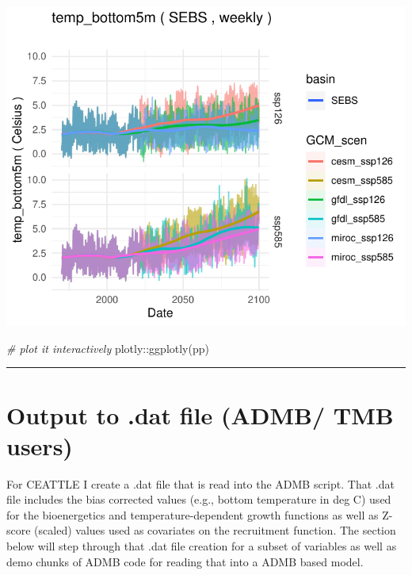 \documentclass[
]{article}
\newenvironment{Shaded}{\begin{snugshade}}{\end{snugshade}}
\newcommand{\CommentTok}[1]{\textcolor[rgb]{0.56,0.35,0.01}{\textit{#1}}}
\newcommand{\FunctionTok}[1]{\textcolor[rgb]{0.00,0.00,0.00}{#1}}
\newcommand{\NormalTok}[1]{#1}
\newcommand{\SpecialCharTok}[1]{\textcolor[rgb]{0.00,0.00,0.00}{#1}}
\begin{document}
\begin{center}\includegraphics{ACLIM2_quickStart_files/figure-latex/sizespec-2} \end{center}

\begin{Shaded}
\begin{Highlighting}[]
\CommentTok{\# plot it interactively}
\NormalTok{plotly}\SpecialCharTok{::}\FunctionTok{ggplotly}\NormalTok{(pp)}
\end{Highlighting}
\end{Shaded}

\begin{center}\rule{0.5\linewidth}{0.5pt}\end{center}

\hypertarget{output-to-.dat-file-admb-tmb-users}{%
\section{Output to .dat file (ADMB/ TMB
users)}\label{output-to-.dat-file-admb-tmb-users}}

For CEATTLE I create a .dat file that is read into the ADMB script. That
.dat file includes the bias corrected values (e.g., bottom temperature
in deg C) used for the bioenergetics and temperature-dependent growth
functions as well as Z-score (scaled) values used as covariates on the
recruitment function. The section below will step through that .dat file
creation for a subset of variables as well as demo chunks of ADMB code
for reading that into a ADMB based model.
\end{document}
